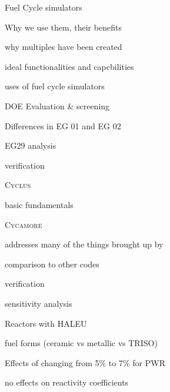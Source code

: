 \documentclass{report}
\newcommand{\Cyclus}{\textsc{Cyclus}\xspace}%
\newcommand{\Cycamore}{\textsc{Cycamore}\xspace}%
\begin{document}
\begin{outline}
\begin{outline}
    \item Fuel Cycle simulators
    \begin{outline}
        \item Why we use them, their benefits
        \item why multiples have been created
        \item ideal functionalities and capcbilities \cite{huff_next_2010,brown_identification_2016}
        \item uses of fuel cycle simulators
        \begin{outline}
            \item \gls{DOE} Evaluation \& screening \cite{wigeland_nuclear_2014}
                \begin{outline}
                      \item Differences in EG 01 and EG 02 
                \end{outline}
            \item EG29 analysis \cite{sunny_transition_2015}
            \item verification \cite{feng_standardized_2016}
        \end{outline}
        \item \Cyclus \cite{huff_fundamental_2016}
        \begin{outline}
              \item basic fundamentals 
              \item \Cycamore \cite{scopatz_cyclus_2015}
              \item addresses many of the things brought up by \cite{huff_next_2010}
              \item comparison to other codes \cite{djokic_application_2015}
              \item verification \cite{bae_standardized_2019}
        \end{outline}
        \item sensitivity analysis
    \end{outline}    
    \item Reactors with HALEU
    \begin{outline}
        \item fuel forms (ceramic vs metallic vs TRISO)
        \item Effects of changing from 5\% to 7\% for PWR \cite{burns_reactor_2020}
        \begin{outline}
            \item no effects on reactivity coefficients

\end{outline}
\end{outline}
\end{outline}
\end{outline}
\end{document}
